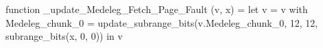 function _update_Medeleg_Fetch_Page_Fault (v, x) = let v = { v with Medeleg_chunk_0 = update_subrange_bits(v.Medeleg_chunk_0, 12, 12, subrange_bits(x, 0, 0)) } in
  v
